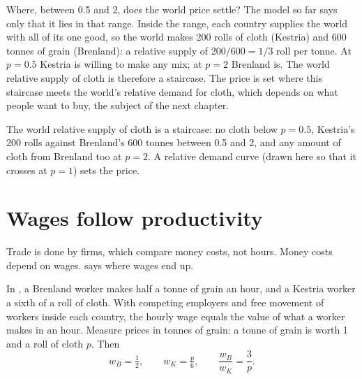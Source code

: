Where, between 0.5 and 2, does the world price settle? The model so far says only that it lies in that
range. Inside the range, each country supplies the world with all of its one good, so the world makes
200 rolls of cloth (Kestria) and 600 tonnes of grain (Brenland): a relative supply of $200/600 = 1/3$ roll per
tonne. At $p = 0.5$ Kestria is willing to make any mix; at $p = 2$ Brenland is. The world relative supply of
cloth is therefore a staircase. The price is set where this staircase meets the world's relative demand for
cloth, which depends on what people want to buy, the subject of the next chapter.

\begin{omfigure}

{\small The world relative supply of cloth is a staircase: no cloth below $p = 0.5$, Kestria's 200 rolls
against Brenland's 600 tonnes between 0.5 and 2, and any amount of cloth from Brenland too at $p = 2$. A
relative demand curve (drawn here so that it crosses at $p = 1$) sets the price.}
\end{omfigure}

\section{Wages follow productivity}\label{sec:g10:ricardo-model:wages}

Trade is done by firms, which compare money costs, not hours. Money costs depend on wages. 
says where wages end up.

In , a Brenland worker makes half a tonne of grain an hour, and a Kestria worker a
sixth of a roll of cloth. With competing employers and free movement of workers inside each country, the
hourly wage equals the value of what a worker makes in an hour. Measure prices in tonnes of grain: a tonne
of grain is worth 1 and a roll of cloth $p$. Then
\[
  w_B = \tfrac12, \qquad w_K = \tfrac{p}{6}, \qquad \frac{w_B}{w_K} = \frac{3}{p}.
\]

